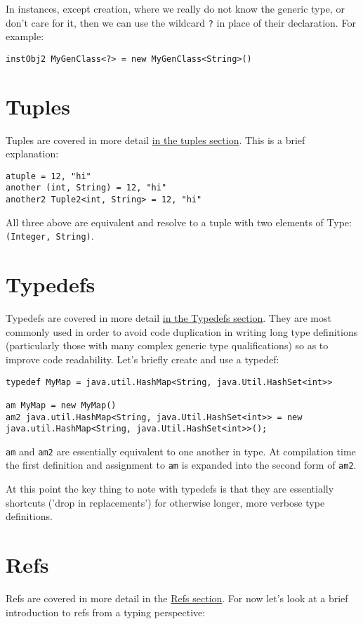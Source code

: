 \documentclass[conc-doc]{subfiles}
\begin{document}
In instances, except creation, where we really do not know the generic type, or don't care for it, then we can use the wildcard \lstinline{?} in place of their declaration. For example:

\begin{lstlisting}
instObj2 MyGenClass<?> = new MyGenClass<String>()
\end{lstlisting}

\section{Tuples}
Tuples are covered in more detail \hyperref[chap:tuples]{in the tuples section}. This is a brief explanation:

\begin{lstlisting}
atuple = 12, "hi"
another (int, String) = 12, "hi"
another2 Tuple2<int, String> = 12, "hi"
\end{lstlisting}

All three above are equivalent and resolve to a tuple with two elements of Type: \lstinline{(Integer, String)}.

\section{Typedefs}
Typedefs are covered in more detail \hyperref[chap:typedefs]{in the Typedefs section}. They are most commonly used in order to avoid code duplication in writing long type definitions (particularly those with many complex generic type qualifications) so as to improve code readability. Let's briefly create and use a typedef:

\begin{lstlisting}
typedef MyMap = java.util.HashMap<String, java.Util.HashSet<int>>

am MyMap = new MyMap()
am2 java.util.HashMap<String, java.Util.HashSet<int>> = new java.util.HashMap<String, java.Util.HashSet<int>>(); 
\end{lstlisting}

\lstinline{am} and \lstinline{am2} are essentially equivalent to one another in type. At compilation time the first definition and assignment to \lstinline{am} is expanded into the second form of \lstinline{am2}.

At this point the key thing to note with typedefs is that they are essentially shortcuts ('drop in replacements') for otherwise longer, more verbose type definitions.

\section{Refs}
Refs are covered in more detail in the \hyperref[sec:refs]{Refs section}. For now let's look at a brief introduction to refs from a typing perspective:
\end{document}
